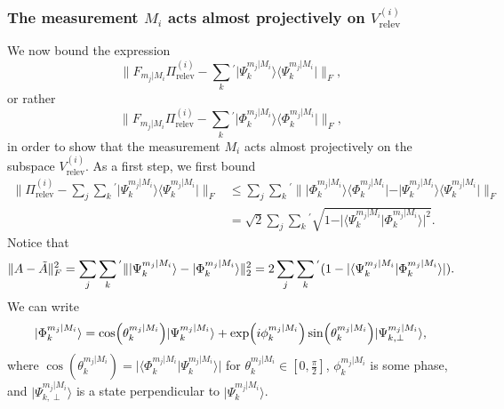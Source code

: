 \subsubsection{The measurement $M_i$ acts almost projectively on $V_{\text{relev}}^{(i)}$}
We now bound the expression
\begin{equation}
\|F_{m_j\vert M_i}\Pi_{\text{relev}}^{(i)}-\sum_{k}{}^{'}\vert \Psi_k^{m_j\vert M_i}\rangle \langle \Psi_k^{m_j\vert M_i}\vert \|_F,
\end{equation}
or rather
\begin{equation}
\|F_{m_j\vert M_i}\Pi_{\text{relev}}^{(i)}-\sum_{k}{}^{'}\vert \Phi_k^{m_j\vert M_i}\rangle \langle \Phi_k^{m_j\vert M_i}\vert \|_F,
\end{equation}
in order to show that the measurement $M_i$ acts almost projectively on the subspace $V_{\text{relev}}^{(i)}$. As a first step, we first bound
\begin{equation}
\begin{split}
\|\Pi_{\text{relev}}^{(i)}-\sum_j\sum_k{}^{'}\vert \Psi_k^{m_j\vert M_i}\rangle \langle \Psi_k^{m_j\vert M_i}\vert \|_F & \leq \sum_j\sum_k{}^{'}\| \vert \Phi_k^{m_j\vert M_i}\rangle \langle \Phi_k^{m_j\vert M_i}\vert-\vert \Psi_k^{m_j\vert M_i}\rangle \langle \Psi_k^{m_j\vert M_i}\vert\|_F \\
& =\sqrt{2}\sum_j\sum_k{}^{'}\sqrt{1-\vert \langle \Psi_k^{m_j\vert M_i} \vert \Phi_k^{m_j\vert M_i} \rangle \vert^2}.
\end{split}
\end{equation}
Notice that
\begin{equation}
\|A-\Tilde{A}\|_F^2=\sum_j\sum_k{}^{'}\|\vert \Psi_k^{m_j\vert M_i} \rangle - \vert \Phi_k^{m_j\vert M_i}\rangle\|_2^2=2\sum_j\sum_k{}^{'}(1-\vert\langle \Psi_k^{m_j\vert M_i} \vert \Phi_k^{m_j\vert M_i} \rangle \vert).
\end{equation}
We can write 
\begin{equation}
\vert \Phi_k^{m_j\vert M_i}\rangle = \cos(\theta_k^{m_j\vert M_i})\vert \Psi_k^{m_j\vert M_i}\rangle + \exp(i\phi_k^{m_j\vert M_i})\sin(\theta_k^{m_j\vert M_i})\vert \Psi_{k,\perp}^{m_j\vert M_i} \rangle, \\[0.5em]
\end{equation}
where $\cos(\theta_k^{m_j\vert M_i})= \vert\langle \Phi_k^{m_j\vert M_i}\vert\Psi_k^{m_j\vert M_i} \rangle\vert$ for $\theta_k^{m_j\vert M_i}\in[0,\frac{\pi}{2}]$, $\phi_k^{m_j\vert M_i}$ is some phase, and $\vert \Psi_{k,\perp}^{m_j\vert M_i} \rangle$ is a state perpendicular to $\vert \Psi_k^{m_j\vert M_i}\rangle$.
